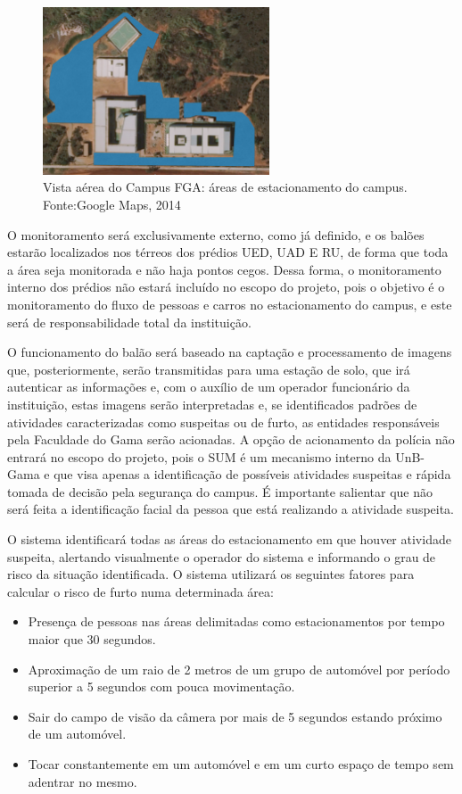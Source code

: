   \begin{figure}[H]
  	\centering
  	\includegraphics[width=0.6\textwidth]{figuras/fga2}
  	\caption{Vista aérea do Campus FGA:  áreas de estacionamento do campus. Fonte:Google Maps, 2014}
  	\label{img:fga2}
  \end{figure}

  O monitoramento será exclusivamente externo, como já definido, e os balões estarão localizados nos térreos dos prédios UED, UAD E RU, de forma que toda a área seja monitorada e não haja pontos cegos. Dessa forma, o monitoramento interno dos prédios não estará incluído no escopo do projeto, pois o objetivo é o monitoramento do fluxo de pessoas e carros no estacionamento do campus, e este será de responsabilidade total da instituição.

  O funcionamento do balão será baseado na captação e processamento de imagens que, posteriormente, serão transmitidas para uma estação de solo, que irá autenticar as informações e, com o auxílio de um operador funcionário da instituição, estas imagens serão interpretadas e, se identificados padrões de atividades caracterizadas como suspeitas ou de furto, as entidades responsáveis pela Faculdade do Gama serão acionadas. A opção de acionamento da polícia não entrará no escopo do projeto, pois o SUM é um mecanismo interno da UnB-Gama e que visa apenas a identificação de possíveis atividades suspeitas e rápida tomada de decisão pela segurança do campus. É importante salientar que não será feita a identificação facial da pessoa que está realizando a atividade suspeita.

  O sistema identificará todas as áreas do estacionamento em que houver atividade suspeita, alertando visualmente o operador do sistema e informando o grau de risco da situação identificada. O sistema utilizará os seguintes fatores para calcular o risco de furto numa determinada área:

  \begin{itemize}
    \item Presença de pessoas nas áreas delimitadas como estacionamentos por tempo maior que 30 segundos.
    \item Aproximação de um raio de 2 metros de um grupo de automóvel por período superior a 5 segundos com pouca movimentação.
    \item Sair do campo de visão da câmera por mais de 5 segundos estando próximo de um automóvel.
    \item Tocar constantemente em um automóvel e em um curto espaço de tempo sem adentrar no mesmo.
  \end{itemize}

